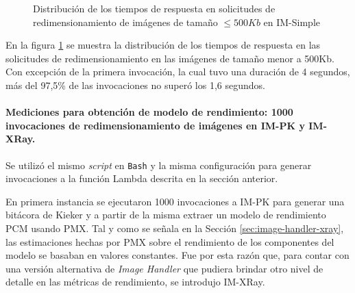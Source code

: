 \begin{figure}[h]
\hspace{-2.0cm}
\caption{Distribución de los tiempos de respuesta en solicitudes de redimensionamiento de imágenes de tamaño $\leq 500Kb$ en IM-Simple}
\label{fig:distribucion-solicitudes-imagenes-hasta-500kb}
\end{figure}

En la figura \ref{fig:distribucion-solicitudes-imagenes-hasta-500kb} se muestra la distribución de los tiempos de respuesta en las solicitudes de redimensionamiento en las imágenes de tamaño menor a 500Kb. Con excepción de la primera invocación, la cual tuvo una duración de 4 segundos, más del 97,5\% de las invocaciones no superó los 1,6 segundos.

\paragraph{Mediciones para obtención de modelo de rendimiento: 1000 invocaciones de redimensionamiento de imágenes en IM-PK y IM-XRay.} Se utilizó el mismo \emph{script} en \texttt{Bash} y la misma configuración para generar invocaciones a la función Lambda descrita en la sección anterior.

En primera instancia se ejecutaron 1000 invocaciones a IM-PK para generar una bitácora de Kieker y a partir de la misma extraer un modelo de rendimiento PCM usando PMX. Tal y como se señala en la Sección \ref{sec:image-handler-xray}, las estimaciones hechas por PMX sobre el rendimiento de los componentes del modelo se basaban en valores constantes. Fue por esta razón que, para contar con una versión alternativa de \emph{Image Handler} que pudiera brindar otro nivel de detalle en las  métricas de rendimiento, se introdujo IM-XRay.

